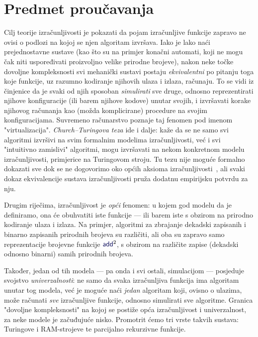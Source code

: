 \section{Predmet proučavanja}

Cilj teorije izračunljivosti je pokazati da pojam izračunljive funkcije zapravo ne ovisi o podlozi na kojoj se njen algoritam izvršava. Iako je lako naći prejednostavne sustave (kao što su na primjer konačni automati, koji ne mogu čak niti uspoređivati proizvoljno velike prirodne brojeve), nakon neke točke dovoljne kompleksnosti svi mehanički sustavi postaju \emph{ekvivalentni} po pitanju toga koje funkcije, uz razumno kodiranje njihovih ulaza i izlaza, računaju. To se vidi iz činjenice da je svaki od njih sposoban \emph{simulirati} sve druge, odnosno reprezentirati njihove konfiguracije (ili barem njihove kodove) unutar svojih, i izvršavati korake njihovog računanja kao (možda komplicirane) procedure na svojim konfiguracijama. Suvremeno računarstvo poznaje taj fenomen pod imenom "virtualizacija". \emph{Church--\!Turingova teza} ide i dalje: kaže da se ne samo svi algoritmi izvršivi na svim formalnim modelima izračunljivosti, već i svi "intuitivno zamislivi" algoritmi, mogu izvršavati na nekom konkretnom modelu izračunljivosti, primjerice na Turingovom stroju. Tu tezu nije moguće formalno dokazati sve dok se ne dogovorimo oko općih aksioma izračunljivosti~\cite{dershowitz}, ali svaki dokaz ekvivalencije sustava izračunljivosti pruža dodatnu empirijsku potvrdu za nju.

Drugim riječima, izračunljivost je \emph{opći} fenomen: u kojem god modelu da je definiramo, ona će obuhvatiti iste funkcije --- ili barem iste s obzirom na prirodno kodiranje ulaza i izlaza. Na primjer, algoritmi za zbrajanje dekadski zapisanih i binarno zapisanih prirodnih brojeva su različiti, ali oba su zapravo samo reprezentacije brojevne funkcije $\f{add}^2$, s obzirom na različite zapise (dekadski odnosno binarni) samih prirodnih brojeva.

Također, jedan od tih modela --- pa onda i svi ostali, simulacijom --- posjeduje svojstvo \emph{univerzalnosti}: ne samo da svaka izračunljiva funkcija ima algoritam unutar tog modela, već je moguće naći \emph{jedan} algoritam koji, ovisno o ulazima, može računati \emph{sve} izračunljive funkcije, odnosno simulirati sve algoritme. Granica "dovoljne kompleksnosti" na kojoj se postiže opća izračunljivost i univerzalnost, za neke modele je začuđujuće nisko. Promotrit ćemo tri vrste takvih sustava: Turingove i RAM-strojeve te parcijalno rekurzivne funkcije.

